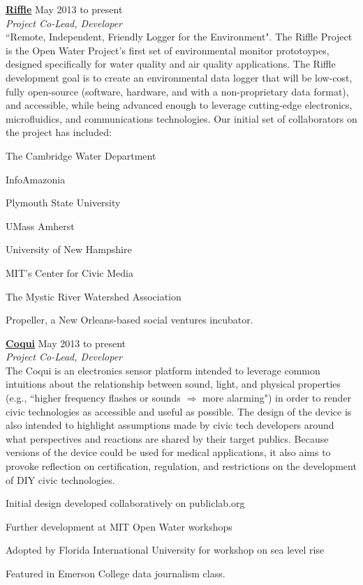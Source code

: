 \documentclass[10pt]{article}
\newcommand{\halfblankline}{\quad\vspace{-0.5\baselineskip}\pagebreak[3]}
\begin{document}
\halfblankline

\href{http://openwaterproject.io}{\textbf{Riffle}} \hfill {May 2013 to present} \\
\emph{Project Co-Lead, Developer} \\
``Remote, Independent, Friendly Logger for the Environment".  The Riffle Project is the Open Water Project's first set of environmental monitor prototoypes, designed specifically for water quality and air quality applications. The Riffle development goal is to create an environmental data logger that will be low-cost, fully open-source (software, hardware, and with a non-proprietary data format), and  accessible, while being advanced enough to leverage cutting-edge electronics, microfluidics, and communications technologies.  
Our initial set of collaborators on the project has included:
\begin{innerlist}
        \item The Cambridge Water Department
        \item InfoAmazonia
\item Plymouth State University
\item UMass Amherst
\item University of New Hampshire
\item MIT's Center for Civic Media
\item The Mystic River Watershed Association
\item Propeller, a New Orleans-based social ventures incubator.
\end{innerlist}

\halfblankline

\href{http://openwaterproject.io}{\textbf{Coqui}} \hfill {May 2013 to present} \\
\emph{Project Co-Lead, Developer} \\
The Coqui is an electronics sensor platform intended to leverage common intuitions about the relationship between sound, light, and physical properties (e.g., ``higher frequency flashes or sounds $\Rightarrow$ more alarming") in order to render civic technologies as accessible and useful as possible. The design of the device is also intended to highlight assumptions made by civic tech developers around what perspectives and reactions are shared by their target publics.  Because versions of the device could be used for medical applications, it also aims to provoke reflection on certification, regulation, and restrictions on the development of DIY civic technologies.
    \begin{innerlist}
        \item Initial design developed collaboratively on publiclab.org
\item Further development at MIT Open Water workshops
\item Adopted by Florida International University for workshop on sea level rise
        \item Featured in Emerson College data journalism class.
\end{innerlist}
\end{document}
